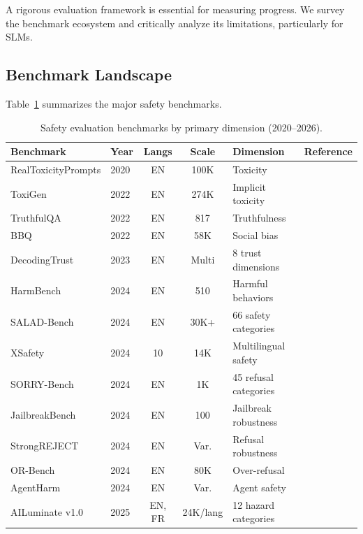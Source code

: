 \documentclass[12pt,a4paper]{article}
\begin{document}
A rigorous evaluation framework is essential for measuring progress. We survey the benchmark ecosystem and critically analyze its limitations, particularly for SLMs.

\subsection{Benchmark Landscape}

Table~\ref{tab:benchmarks} summarizes the major safety benchmarks.

\begin{table}[t]
\centering
\caption{Safety evaluation benchmarks by primary dimension (2020--2026).}\label{tab:benchmarks}
\scriptsize
\setlength{\tabcolsep}{3pt}
\begin{tabular}{@{}llccll@{}}
\toprule
\textbf{Benchmark} & \textbf{Year} & \textbf{Langs} & \textbf{Scale} & \textbf{Dimension} & \textbf{Reference} \\
\midrule
RealToxicityPrompts & 2020 & EN & 100K & Toxicity & \citet{gehman2020realtoxicity} \\
ToxiGen & 2022 & EN & 274K & Implicit toxicity & \citet{hartvigsen2022toxigen} \\
TruthfulQA & 2022 & EN & 817 & Truthfulness & \citet{lin2022truthfulqa} \\
BBQ & 2022 & EN & 58K & Social bias & \citet{parrish2022bbq} \\
DecodingTrust & 2023 & EN & Multi & 8 trust dimensions & \citet{wang2023decodingtrust} \\
HarmBench & 2024 & EN & 510 & Harmful behaviors & \citet{mazeika2024harmbench} \\
SALAD-Bench & 2024 & EN & 30K+ & 66 safety categories & \citet{li2024salad} \\
XSafety & 2024 & 10 & 14K & Multilingual safety & \citet{wang2024xsafety} \\
SORRY-Bench & 2024 & EN & 1K & 45 refusal categories & \citet{xie2024sorry} \\
JailbreakBench & 2024 & EN & 100 & Jailbreak robustness & \citet{chao2024jailbreakbench} \\
StrongREJECT & 2024 & EN & Var. & Refusal robustness & \citet{souly2024strongreject} \\
OR-Bench & 2024 & EN & 80K & Over-refusal & \citet{cui2024orbench} \\
AgentHarm & 2024 & EN & Var. & Agent safety & \citet{andriushchenko2024agentharm} \\
AILuminate v1.0 & 2025 & EN, FR & 24K/lang & 12 hazard categories & \citet{ailuminate2025} \\

\end{tabular}
\end{table}
\end{document}
